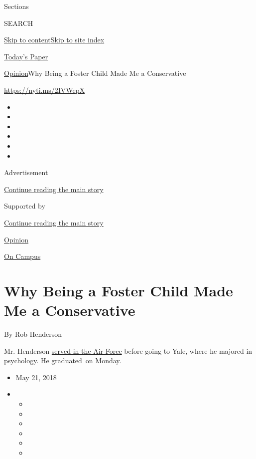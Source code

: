 Sections

SEARCH

\protect\hyperlink{site-content}{Skip to
content}\protect\hyperlink{site-index}{Skip to site index}

\href{https://myaccount.nytimes.com/auth/login?response_type=cookie\&client_id=vi}{}

\href{https://www.nytimes.com/section/todayspaper}{Today's Paper}

\href{/section/opinion}{Opinion}\textbar{}Why Being a Foster Child Made
Me a Conservative

\href{https://nyti.ms/2IVWepX}{https://nyti.ms/2IVWepX}

\begin{itemize}
\item
\item
\item
\item
\item
\item
\end{itemize}

Advertisement

\protect\hyperlink{after-top}{Continue reading the main story}

Supported by

\protect\hyperlink{after-sponsor}{Continue reading the main story}

\href{/section/opinion}{Opinion}

\href{/column/on-campus}{On Campus}

\hypertarget{why-being-a-foster-child-made-me-a-conservative}{%
\section{Why Being a Foster Child Made Me a
Conservative}\label{why-being-a-foster-child-made-me-a-conservative}}

By Rob Henderson

Mr. Henderson
\href{https://news.yale.edu/2018/05/14/senior-arrived-air-force-vet-and-graduates-gates-cambridge-scholar}{served
in the Air Force} before going to Yale, where he majored in psychology.
He graduated~on Monday.

\begin{itemize}
\item
  May 21, 2018
\item
  \begin{itemize}
  \item
  \item
  \item
  \item
  \item
  \item
  \end{itemize}
\end{itemize}

